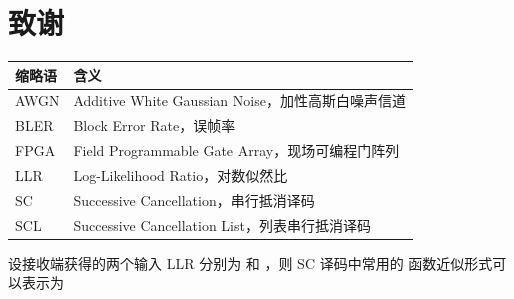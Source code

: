 \documentclass[a4paper,AutoFakeBold,openright,12pt]{book}
\begin{document}



\cleardoublepage


\makeatletter
\let\ps@plain\ps@frontmatter
\makeatother
\frontmatter
\tableofcontents

\makeatletter
\let\ps@plain\ps@mainmatter
\makeatother
\mainmatter







\cleardoublepage
{}
{}

\makeatletter
\let\buptorigbibitem\bibitem
\renewcommand{\bibnumfmt}[1]{{\songti\setstretch{1.5}\fontsize{10.5pt}{15.75pt}\selectfont[#1]}}
\renewcommand{\bibitem}[1]{\buptorigbibitem{#1}\songti\setstretch{1.5}\fontsize{10.5pt}{15.75pt}\selectfont}
\makeatother


\cleardoublepage
\chapter*{致谢}
{}
\normalsize
\thankwords

\begin{tabular}{@{}p{2.2cm} p{11.2cm}@{}}
    \toprule
    缩略语 & 含义 \\
    \midrule
    AWGN & Additive White Gaussian Noise，加性高斯白噪声信道 \\
    BLER & Block Error Rate，误帧率 \\
    FPGA & Field Programmable Gate Array，现场可编程门阵列 \\
    LLR & Log-Likelihood Ratio，对数似然比 \\
    SC & Successive Cancellation，串行抵消译码 \\
    SCL & Successive Cancellation List，列表串行抵消译码 \\
    \bottomrule
\end{tabular}

设接收端获得的两个输入 LLR 分别为  和 ，则 SC 译码中常用的  函数近似形式可以表示为

\begin{center}
\end{center}
\end{document}
